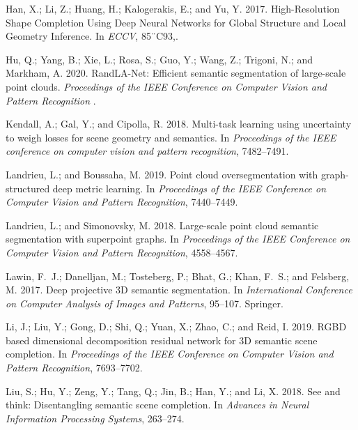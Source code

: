 \documentclass[letterpaper]{article} \usepackage{aaai21}  \usepackage{times}  \usepackage{helvet} \usepackage{courier}  \usepackage[hyphens]{url}  \usepackage{graphicx} \urlstyle{rm} \def\UrlFont{\rm}  \usepackage{natbib}  \usepackage{booktabs}
\begin{document}
\begin{thebibliography}{48}
Han, X.; Li, Z.; Huang, H.; Kalogerakis, E.; and Yu, Y. 2017.
\newblock High-Resolution Shape Completion Using Deep Neural Networks for
  Global Structure and Local Geometry Inference.
\newblock In \emph{ECCV}, 85¨C93,.

Hu, Q.; Yang, B.; Xie, L.; Rosa, S.; Guo, Y.; Wang, Z.; Trigoni, N.; and
  Markham, A. 2020.
\newblock RandLA-Net: Efficient semantic segmentation of large-scale point
  clouds.
\newblock \emph{Proceedings of the IEEE Conference on Computer Vision and
  Pattern Recognition} .

Kendall, A.; Gal, Y.; and Cipolla, R. 2018.
\newblock Multi-task learning using uncertainty to weigh losses for scene
  geometry and semantics.
\newblock In \emph{Proceedings of the IEEE conference on computer vision and
  pattern recognition}, 7482--7491.

Landrieu, L.; and Boussaha, M. 2019.
\newblock Point cloud oversegmentation with graph-structured deep metric
  learning.
\newblock In \emph{Proceedings of the IEEE Conference on Computer Vision and
  Pattern Recognition}, 7440--7449.

Landrieu, L.; and Simonovsky, M. 2018.
\newblock Large-scale point cloud semantic segmentation with superpoint graphs.
\newblock In \emph{Proceedings of the IEEE Conference on Computer Vision and
  Pattern Recognition}, 4558--4567.

Lawin, F.~J.; Danelljan, M.; Tosteberg, P.; Bhat, G.; Khan, F.~S.; and
  Felsberg, M. 2017.
\newblock Deep projective 3D semantic segmentation.
\newblock In \emph{International Conference on Computer Analysis of Images and
  Patterns}, 95--107. Springer.

Li, J.; Liu, Y.; Gong, D.; Shi, Q.; Yuan, X.; Zhao, C.; and Reid, I. 2019.
\newblock RGBD based dimensional decomposition residual network for 3D semantic
  scene completion.
\newblock In \emph{Proceedings of the IEEE Conference on Computer Vision and
  Pattern Recognition}, 7693--7702.

Liu, S.; Hu, Y.; Zeng, Y.; Tang, Q.; Jin, B.; Han, Y.; and Li, X. 2018.
\newblock See and think: Disentangling semantic scene completion.
\newblock In \emph{Advances in Neural Information Processing Systems},
  263--274.


\end{thebibliography}
\end{document}
